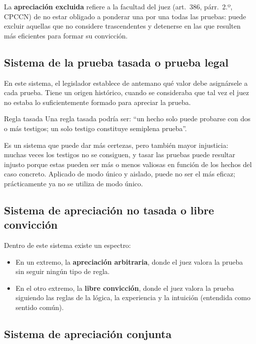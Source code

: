 \documentclass[12pt,oneside]{book}
\begin{document}
La \textbf{apreciación excluida} refiere a la facultad del juez (art.~386, párr.~2.º, CPCCN) de no estar obligado a ponderar una por una todas las pruebas: puede excluir aquellas que no considere trascendentes y detenerse en las que resulten más eficientes para formar su convicción.

\subsection{Sistema de la prueba tasada o prueba legal}

En este sistema, el legislador establece de antemano qué valor debe asignársele a cada prueba. Tiene un origen histórico, cuando se consideraba que tal vez el juez no estaba lo suficientemente formado para apreciar la prueba.

\begin{example}{Regla tasada}
Una regla tasada podría ser: ``un hecho solo puede probarse con dos o más testigos; un solo testigo constituye semiplena prueba''.
\end{example}

Es un sistema que puede dar más certezas, pero también mayor injusticia: muchas veces los testigos no se consiguen, y tasar las pruebas puede resultar injusto porque estas pueden ser más o menos valiosas en función de los hechos del caso concreto. Aplicado de modo único y aislado, puede no ser el más eficaz; prácticamente ya no se utiliza de modo único.

\subsection{Sistema de apreciación no tasada o libre convicción}

Dentro de este sistema existe un espectro:

\begin{itemize}
    \item En un extremo, la \textbf{apreciación arbitraria}, donde el juez valora la prueba sin seguir ningún tipo de regla.
    \item En el otro extremo, la \textbf{libre convicción}, donde el juez valora la prueba siguiendo las reglas de la lógica, la experiencia y la intuición (entendida como sentido común).
\end{itemize}

\subsection{Sistema de apreciación conjunta}
\end{document}

